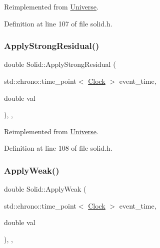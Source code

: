 Reimplemented from \hyperlink{class_universe_a62789bcff84bd750b0366004381e2fdd}{Universe}.



Definition at line 107 of file solid.\+h.

\mbox{\label{class_solid_a07534fa79bb8a6eb32e081e5158ba9e5}} 
\subsubsection{\texorpdfstring{Apply\+Strong\+Residual()}{ApplyStrongResidual()}}
{\footnotesize\ttfamily double Solid\+::\+Apply\+Strong\+Residual (\begin{DoxyParamCaption}\item[{std\+::chrono\+::time\+\_\+point$<$ \hyperlink{universe_8h_a0ef8d951d1ca5ab3cfaf7ab4c7a6fd80}{Clock} $>$}]{event\+\_\+time,  }\item[{double}]{val }\end{DoxyParamCaption})\hspace{0.3cm}{\ttfamily [inline]}, {\ttfamily [final]}, {\ttfamily [virtual]}}



Reimplemented from \hyperlink{class_universe_af7becebb347be9a85541d96a3eca1ca7}{Universe}.



Definition at line 108 of file solid.\+h.

\mbox{\label{class_solid_a49e35bf258104b7bce225dc21058affb}} 
\subsubsection{\texorpdfstring{Apply\+Weak()}{ApplyWeak()}}
{\footnotesize\ttfamily double Solid\+::\+Apply\+Weak (\begin{DoxyParamCaption}\item[{std\+::chrono\+::time\+\_\+point$<$ \hyperlink{universe_8h_a0ef8d951d1ca5ab3cfaf7ab4c7a6fd80}{Clock} $>$}]{event\+\_\+time,  }\item[{double}]{val }\end{DoxyParamCaption})\hspace{0.3cm}{\ttfamily [inline]}, {\ttfamily [final]}, {\ttfamily [virtual]}}



